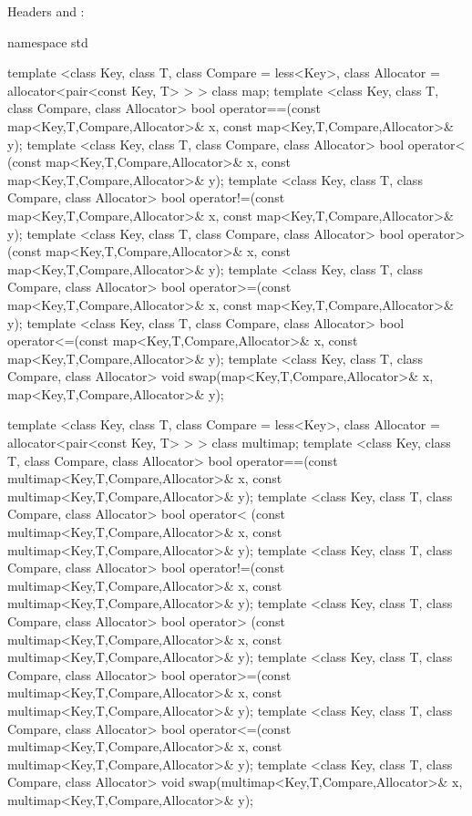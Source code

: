 \pnum
Headers  and :

%

\begin{codeblock}
namespace std {
  template <class Key, class T, class Compare = less<Key>,
            class Allocator = allocator<pair<const Key, T> > >
    class map;
  template <class Key, class T, class Compare, class Allocator>
    bool operator==(const map<Key,T,Compare,Allocator>& x,
                    const map<Key,T,Compare,Allocator>& y);
  template <class Key, class T, class Compare, class Allocator>
    bool operator< (const map<Key,T,Compare,Allocator>& x,
                    const map<Key,T,Compare,Allocator>& y);
  template <class Key, class T, class Compare, class Allocator>
    bool operator!=(const map<Key,T,Compare,Allocator>& x,
                    const map<Key,T,Compare,Allocator>& y);
  template <class Key, class T, class Compare, class Allocator>
    bool operator> (const map<Key,T,Compare,Allocator>& x,
                    const map<Key,T,Compare,Allocator>& y);
  template <class Key, class T, class Compare, class Allocator>
    bool operator>=(const map<Key,T,Compare,Allocator>& x,
                    const map<Key,T,Compare,Allocator>& y);
  template <class Key, class T, class Compare, class Allocator>
    bool operator<=(const map<Key,T,Compare,Allocator>& x,
                    const map<Key,T,Compare,Allocator>& y);
  template <class Key, class T, class Compare, class Allocator>
    void swap(map<Key,T,Compare,Allocator>& x,
              map<Key,T,Compare,Allocator>& y);

  template <class Key, class T, class Compare = less<Key>,
            class Allocator = allocator<pair<const Key, T> > >
    class multimap;
  template <class Key, class T, class Compare, class Allocator>
    bool operator==(const multimap<Key,T,Compare,Allocator>& x,
                    const multimap<Key,T,Compare,Allocator>& y);
  template <class Key, class T, class Compare, class Allocator>
    bool operator< (const multimap<Key,T,Compare,Allocator>& x,
                    const multimap<Key,T,Compare,Allocator>& y);
  template <class Key, class T, class Compare, class Allocator>
    bool operator!=(const multimap<Key,T,Compare,Allocator>& x,
                    const multimap<Key,T,Compare,Allocator>& y);
  template <class Key, class T, class Compare, class Allocator>
    bool operator> (const multimap<Key,T,Compare,Allocator>& x,
                    const multimap<Key,T,Compare,Allocator>& y);
  template <class Key, class T, class Compare, class Allocator>
    bool operator>=(const multimap<Key,T,Compare,Allocator>& x,
                    const multimap<Key,T,Compare,Allocator>& y);
  template <class Key, class T, class Compare, class Allocator>
    bool operator<=(const multimap<Key,T,Compare,Allocator>& x,
                    const multimap<Key,T,Compare,Allocator>& y);
  template <class Key, class T, class Compare, class Allocator>
    void swap(multimap<Key,T,Compare,Allocator>& x,
              multimap<Key,T,Compare,Allocator>& y);
}
\end{codeblock}


